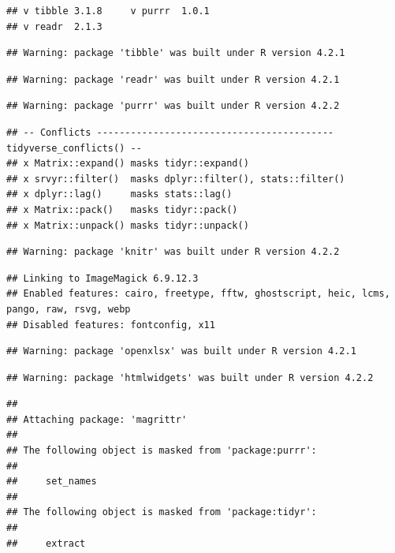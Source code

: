 \documentclass[
  12pt,
]{article}
\begin{document}
\begin{verbatim}
## v tibble 3.1.8     v purrr  1.0.1
## v readr  2.1.3
\end{verbatim}

\begin{verbatim}
## Warning: package 'tibble' was built under R version 4.2.1
\end{verbatim}

\begin{verbatim}
## Warning: package 'readr' was built under R version 4.2.1
\end{verbatim}

\begin{verbatim}
## Warning: package 'purrr' was built under R version 4.2.2
\end{verbatim}

\begin{verbatim}
## -- Conflicts ------------------------------------------ tidyverse_conflicts() --
## x Matrix::expand() masks tidyr::expand()
## x srvyr::filter()  masks dplyr::filter(), stats::filter()
## x dplyr::lag()     masks stats::lag()
## x Matrix::pack()   masks tidyr::pack()
## x Matrix::unpack() masks tidyr::unpack()
\end{verbatim}

\begin{verbatim}
## Warning: package 'knitr' was built under R version 4.2.2
\end{verbatim}

\begin{verbatim}
## Linking to ImageMagick 6.9.12.3
## Enabled features: cairo, freetype, fftw, ghostscript, heic, lcms, pango, raw, rsvg, webp
## Disabled features: fontconfig, x11
\end{verbatim}

\begin{verbatim}
## Warning: package 'openxlsx' was built under R version 4.2.1
\end{verbatim}

\begin{verbatim}
## Warning: package 'htmlwidgets' was built under R version 4.2.2
\end{verbatim}

\begin{verbatim}
## 
## Attaching package: 'magrittr'
## 
## The following object is masked from 'package:purrr':
## 
##     set_names
## 
## The following object is masked from 'package:tidyr':
## 
##     extract
\end{verbatim}
\end{document}

